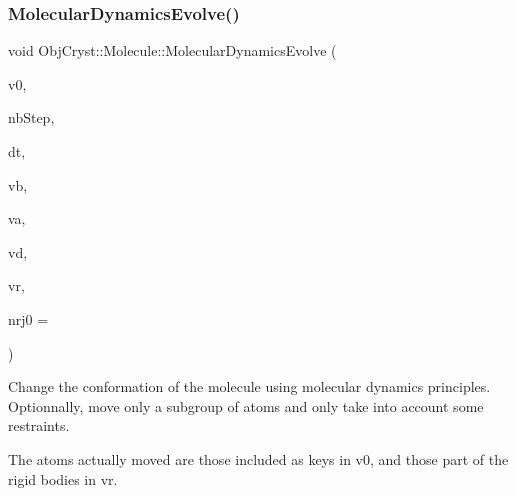 \subsubsection{\texorpdfstring{MolecularDynamicsEvolve()}{MolecularDynamicsEvolve()}}
{\footnotesize\ttfamily void Obj\+Cryst\+::\+Molecule\+::\+Molecular\+Dynamics\+Evolve (\begin{DoxyParamCaption}\item[{std\+::map$<$ \mbox{\hyperlink{class_obj_cryst_1_1_mol_atom}{Mol\+Atom}} $\ast$, \mbox{\hyperlink{struct_obj_cryst_1_1_x_y_z}{X\+YZ}} $>$ \&}]{v0,  }\item[{const unsigned}]{nb\+Step,  }\item[{const R\+E\+AL}]{dt,  }\item[{const std\+::vector$<$ \mbox{\hyperlink{class_obj_cryst_1_1_mol_bond}{Mol\+Bond}} $\ast$ $>$ \&}]{vb,  }\item[{const std\+::vector$<$ \mbox{\hyperlink{class_obj_cryst_1_1_mol_bond_angle}{Mol\+Bond\+Angle}} $\ast$ $>$ \&}]{va,  }\item[{const std\+::vector$<$ \mbox{\hyperlink{class_obj_cryst_1_1_mol_dihedral_angle}{Mol\+Dihedral\+Angle}} $\ast$ $>$ \&}]{vd,  }\item[{std\+::map$<$ \mbox{\hyperlink{class_obj_cryst_1_1_rigid_group}{Rigid\+Group}} $\ast$, std\+::pair$<$ \mbox{\hyperlink{struct_obj_cryst_1_1_x_y_z}{X\+YZ}}, \mbox{\hyperlink{struct_obj_cryst_1_1_x_y_z}{X\+YZ}} $>$ $>$ \&}]{vr,  }\item[{R\+E\+AL}]{nrj0 = {} }\end{DoxyParamCaption})}

Change the conformation of the molecule using molecular dynamics principles. Optionnally, move only a subgroup of atoms and only take into account some restraints.

The atoms actually moved are those included as keys in v0, and those part of the rigid bodies in vr.


